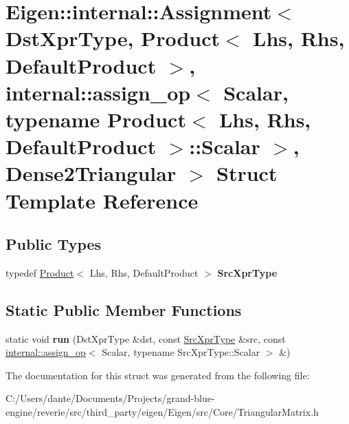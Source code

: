 \hypertarget{struct_eigen_1_1internal_1_1_assignment_3_01_dst_xpr_type_00_01_product_3_01_lhs_00_01_rhs_00_0193a1d113168a246bb6cb34430a4d0595}{}\section{Eigen\+::internal\+::Assignment$<$ Dst\+Xpr\+Type, Product$<$ Lhs, Rhs, Default\+Product $>$, internal\+::assign\+\_\+op$<$ Scalar, typename Product$<$ Lhs, Rhs, Default\+Product $>$\+::Scalar $>$, Dense2\+Triangular $>$ Struct Template Reference}
\label{struct_eigen_1_1internal_1_1_assignment_3_01_dst_xpr_type_00_01_product_3_01_lhs_00_01_rhs_00_0193a1d113168a246bb6cb34430a4d0595}
\subsection*{Public Types}
\begin{DoxyCompactItemize}
\item 
\mbox{\label{struct_eigen_1_1internal_1_1_assignment_3_01_dst_xpr_type_00_01_product_3_01_lhs_00_01_rhs_00_0193a1d113168a246bb6cb34430a4d0595_ab58ff4f79362d670c01cc6fa4d8f238d}} 
typedef \mbox{\hyperlink{class_eigen_1_1_product}{Product}}$<$ Lhs, Rhs, Default\+Product $>$ {\bfseries Src\+Xpr\+Type}
\end{DoxyCompactItemize}
\subsection*{Static Public Member Functions}
\begin{DoxyCompactItemize}
\item 
\mbox{\label{struct_eigen_1_1internal_1_1_assignment_3_01_dst_xpr_type_00_01_product_3_01_lhs_00_01_rhs_00_0193a1d113168a246bb6cb34430a4d0595_a5a4f87a4c03524b1caca94cde6e215ae}} 
static void {\bfseries run} (Dst\+Xpr\+Type \&dst, const \mbox{\hyperlink{class_eigen_1_1_product}{Src\+Xpr\+Type}} \&src, const \mbox{\hyperlink{struct_eigen_1_1internal_1_1assign__op}{internal\+::assign\+\_\+op}}$<$ Scalar, typename Src\+Xpr\+Type\+::\+Scalar $>$ \&)
\end{DoxyCompactItemize}


The documentation for this struct was generated from the following file\+:\begin{DoxyCompactItemize}
\item 
C\+:/\+Users/dante/\+Documents/\+Projects/grand-\/blue-\/engine/reverie/src/third\+\_\+party/eigen/\+Eigen/src/\+Core/Triangular\+Matrix.\+h\end{DoxyCompactItemize}
